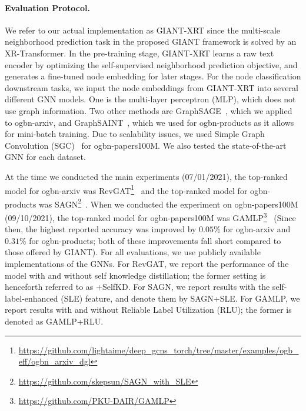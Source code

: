 \documentclass{article} %
\begin{document}
\paragraph{Evaluation Protocol.}
We refer to our actual implementation as GIANT-XRT since the multi-scale neighborhood prediction task in the proposed GIANT framework is solved by an XR-Transformer. In the pre-training stage, GIANT-XRT learns a raw text encoder by optimizing the self-supervised neighborhood prediction objective, and generates a fine-tuned node embedding for later stages.
For the node classification downstream tasks, we input the node embeddings from GIANT-XRT into several different GNN models. One is the multi-layer perceptron (MLP), which does not use graph information. Two other methods are GraphSAGE~\citep{hamilton2017inductive}, which we applied to ogbn-arxiv, and GraphSAINT~\citep{graphsaint-iclr20}, which we used for ogbn-products as it allows for mini-batch training. Due to scalability issues, we used Simple Graph Convolution (SGC)~\citep{wu2019simplifying} for ogbn-papers100M. We also tested the state-of-the-art GNN for each dataset.

At the time we conducted the main experiments (07/01/2021), the top-ranked model for ogbn-arxiv was RevGAT\footnote{\url{https://github.com/lightaime/deep_gcns_torch/tree/master/examples/ogb_eff/ogbn_arxiv_dgl}}~\citep{li2021training} and the top-ranked model for ogbn-products was SAGN\footnote{\url{https://github.com/skepsun/SAGN_with_SLE}}~\citep{sun2021scalable}. When we conducted the experiment on ogbn-papers100M (09/10/2021), the top-ranked model for ogbn-papers100M was GAMLP\footnote{\url{https://github.com/PKU-DAIR/GAMLP}}~\citep{zhang2021graph} (Since then, the highest reported accuracy was improved by $0.05\%$ for ogbn-arxiv and $0.31\%$ for ogbn-products; both of these improvements fall short compared to those offered by GIANT). For all evaluations, we use publicly available implementations of the GNNs. For RevGAT, we report the performance of the model with and without self knowledge distillation; the former setting is henceforth referred to as +SelfKD. For SAGN, we report results with the self-label-enhanced (SLE) feature, and denote them by SAGN+SLE. For GAMLP, we report results with and without Reliable Label Utilization (RLU); the former is denoted as GAMLP+RLU.
\end{document}
